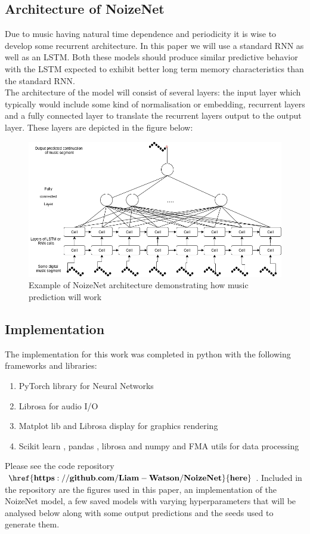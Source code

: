 \documentclass{article}
\begin{document}
\subsection{Architecture of NoizeNet}
\label{sec:arch}
Due to music having natural time dependence and periodicity it is wise to develop some recurrent architecture. In this paper we will use a standard RNN as well as an LSTM. Both these models should produce similar predictive behavior with the LSTM expected to exhibit better long term memory characteristics than the standard RNN. \\
The architecture of the model will consist of several layers: the input layer which typically would include some kind of normalisation or embedding,  recurrent layers and a fully connected layer to translate the recurrent layers output to the output layer. These layers are depicted in the figure below:
\begin{figure}[H]
\centering
\caption{Example of NoizeNet architecture demonstrating how music prediction will work}
\includegraphics[scale=0.5]{NoizeNetArch.png}
\end{figure}
\subsection{Implementation}
\label{sec:impl}
The implementation for this work was completed in python with the following frameworks and libraries:
\begin{enumerate}
\item PyTorch library for Neural Networks \cite{NEURIPS2019_9015}
\item Librosa for audio I/O \cite{mcfee2015librosa} 
\item Matplot lib \cite{Hunter:2007} and Librosa display \cite{mcfee2015librosa} for graphics rendering
\item Scikit learn \cite{scikit-learn}, pandas \cite{reback2020pandas} \cite{mckinney-proc-scipy-2010}, librosa \cite{mcfee2015librosa} and numpy \cite{harris2020array} and FMA utils \cite{fma_dataset}\cite{fma_challenge} for data processing 
\end{enumerate}
Please see the code repository $\mathbf{\href{https://github.com/Liam-Watson/NoizeNet}{here}}$. Included in the repository are the figures used in this paper, an implementation of the NoizeNet model, a few saved models with varying hyperparameters that will be analysed below along with some output predictions and the seeds used to generate them. 
\end{document}

